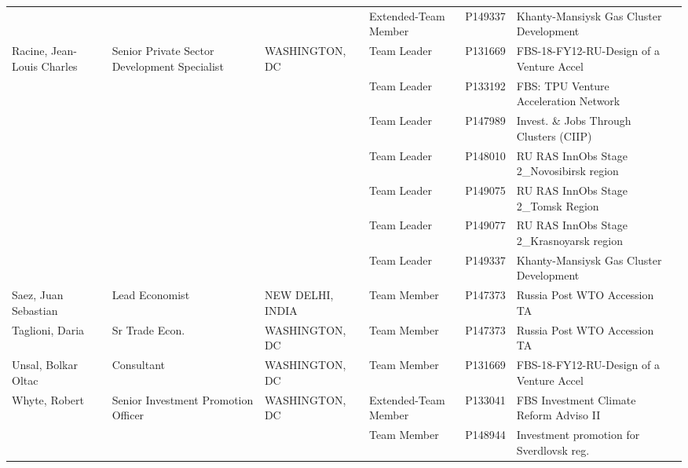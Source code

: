 \documentclass{article}\usepackage[]{graphicx}\usepackage[]{color}
\begin{document}
\begin{minipage}[b]{0.99\textwidth}
{\begin{longtable}{>{\raggedright}p{1.4in}>{\raggedright}p{1in}>{\raggedright}p{1in}>{\raggedright}p{1in}l>{\raggedright}p{1.5in}l}
   &  &  & Extended-Team Member & P149337 & Khanty-Mansiysk Gas Cluster Development &  \\ 
  Racine, Jean-Louis Charles & Senior Private Sector Development Specialist & WASHINGTON, DC & Team Leader & P131669 & FBS-18-FY12-RU-Design of a Venture Accel &  \\ 
   &  &  & Team Leader & P133192 & FBS: TPU Venture Acceleration Network &  \\ 
   &  &  & Team Leader & P147989 & Invest. \& Jobs Through Clusters (CIIP) &  \\ 
   &  &  & Team Leader & P148010 & RU RAS InnObs Stage 2\_Novosibirsk region &  \\ 
   &  &  & Team Leader & P149075 & RU RAS InnObs Stage 2\_Tomsk Region &  \\ 
   &  &  & Team Leader & P149077 & RU RAS InnObs Stage 2\_Krasnoyarsk region &  \\ 
   &  &  & Team Leader & P149337 & Khanty-Mansiysk Gas Cluster Development &  \\ 
  Saez, Juan Sebastian & Lead Economist & NEW DELHI, INDIA & Team Member & P147373 & Russia Post WTO Accession TA &  \\ 
  Taglioni, Daria & Sr Trade Econ. & WASHINGTON, DC & Team Member & P147373 & Russia Post WTO Accession TA &  \\ 
  Unsal, Bolkar Oltac & Consultant & WASHINGTON, DC & Team Member & P131669 & FBS-18-FY12-RU-Design of a Venture Accel &  \\ 
  Whyte, Robert & Senior Investment Promotion Officer & WASHINGTON, DC & Extended-Team Member & P133041 & FBS Investment Climate Reform Adviso II &  \\ 
   &  &  & Team Member & P148944 & Investment promotion for Sverdlovsk reg. &  \\ 
  \hline
\end{longtable}
}

     \vspace*{0.5cm}
\end{minipage}

\end{document}
